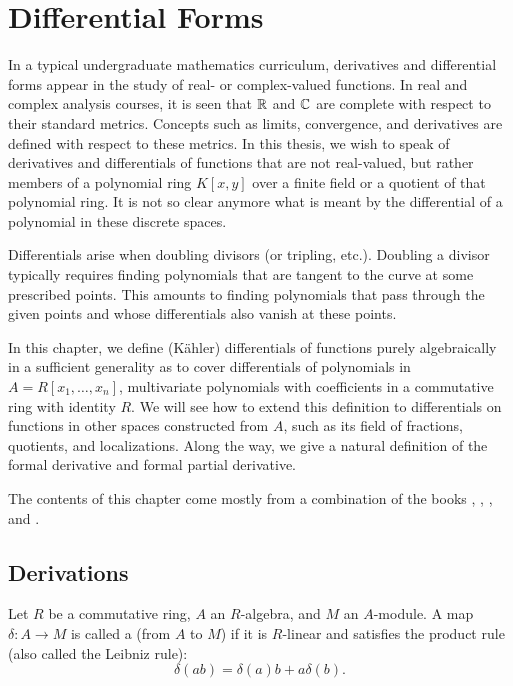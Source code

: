 
\section{Differential Forms}
\label{chap_differentials}

In a typical undergraduate mathematics curriculum,
derivatives and differential forms appear in the study of real- or complex-valued functions.
In real and complex analysis courses,
it is seen that $\mathbb{R}$ and $\mathbb{C}$ are complete with respect to their standard metrics.
Concepts such as limits, convergence, and derivatives are defined with respect to these metrics.
In this thesis, we wish to speak of derivatives and differentials of functions that are not real-valued,
but rather members of a polynomial ring $K[x,y]$ over a finite field or a quotient of that polynomial ring.
It is not so clear anymore what is meant by the differential of a polynomial in these discrete spaces.

Differentials arise when doubling divisors (or tripling, etc.).
Doubling a divisor typically requires finding polynomials that are tangent to the curve at some prescribed points.
This amounts to finding polynomials that pass through the given points
and whose differentials also vanish at these points.

In this chapter, we define (K\"ahler) differentials of functions purely algebraically
in a sufficient generality as to cover differentials of polynomials in $A = R[x_1, \ldots, x_n]$,
multivariate polynomials with coefficients in a commutative ring with identity $R$.
We will see how to extend this definition to differentials on functions in other spaces constructed from $A$,
such as its field of fractions, quotients, and localizations.
Along the way, we give a natural definition of the formal derivative and formal partial derivative.

The contents of this chapter come mostly from a combination of the books
\cite{eisenbud95}, \cite{eisenbud00}, \cite{goldschmidt03}, and \cite{stichtenoth09}.




\subsection{Derivations}
\begin{definition}
  Let $R$ be a commutative ring, $A$ an $R$-algebra, and $M$ an $A$-module.
  A map $\delta : A \to M$ is called a  (from $A$ to $M$)
  if it is $R$-linear and satisfies the product rule
  (also called the Leibniz rule):
    \[ \delta(ab) = \delta(a)b + a\delta(b). \]
\end{definition}

